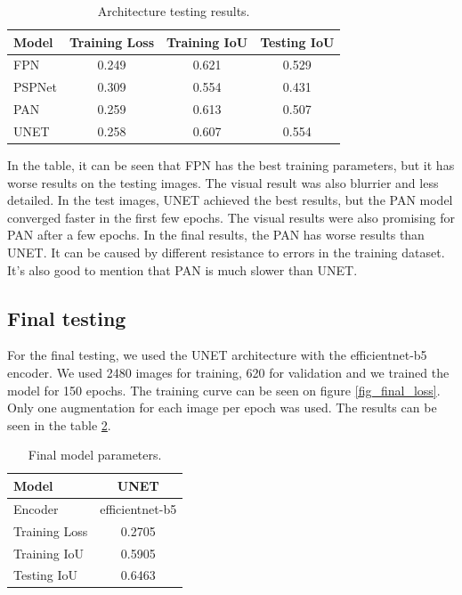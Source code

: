 \documentclass[12pt]{article}
\begin{document}
\begin{table}[H]
    \centering
    \begin{tabular}{|l|c|c|c|}
        \hline
         Model & Training Loss & Training IoU & Testing IoU \\ \hline
         FPN & 0.249 & 0.621 & 0.529  \\
         PSPNet & 0.309  & 0.554 & 0.431  \\
         PAN & 0.259 & 0.613 & 0.507 \\
         UNET & 0.258 & 0.607 & 0.554 \\
         \hline
    \end{tabular}
    \caption{Architecture testing results.}
    \label{table_encoder_tests}
\end{table}

In the table, it can be seen that FPN has the best training parameters, but it has worse results on the testing images. The visual result was also blurrier and less detailed. In the test images, UNET achieved the best results, but the PAN model converged faster in the first few epochs. The visual results were also promising for PAN after a few epochs. In the final results, the PAN has worse results than UNET. It can be caused by different resistance to errors in the training dataset. It's also good to mention that PAN is much slower than UNET.

\subsection{Final testing}

For the final testing, we used the UNET architecture with the efficientnet-b5 encoder. We used 2480 images for training, 620 for validation and we trained the model for 150 epochs. The training curve can be seen on figure \ref{fig_final_loss}. Only one augmentation for each image per epoch was used. The results can be seen in the table \ref{table_final_results}.


\begin{table}[h]
    \centering
    \begin{tabular}{|l|c|}
        \hline
         Model & UNET \\ \hline
         Encoder & efficientnet-b5 \\ \hline
         Training Loss & 0.2705 \\ \hline
         Training IoU & 0.5905 \\ \hline
         Testing IoU & 0.6463\\
         \hline
    \end{tabular}
    \caption{Final model parameters.}
    \label{table_final_results}
\end{table}
\end{document}

